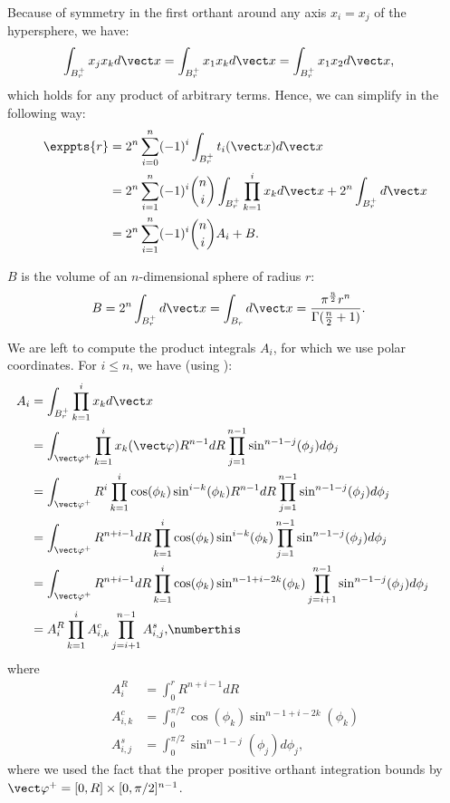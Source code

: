 Because of symmetry in the first orthant around any axis $x_i = x_j$ of the hypersphere, we have:
\begin{align*}
\int_{B^{+}_r}  x_j x_k d\vx &= \int_{B^{+}_r}  x_1 x_k d\vx = \int_{B^{+}_r}  x_1 x_2 d\vx \text{,}
\end{align*}
which holds for any product of arbitrary terms. Hence, we can simplify  in the following way:
\begin{align*}
\exppts{r} &= 2^n \sum_{i=0}^{n} (-1)^{i} \int_{B^{+}_r}  t_i(\vx) d\vx \\
  &= 2^n \sum_{i=1}^{n} (-1)^{i} {n \choose i} \int_{B^{+}_r} \prod_{k=1}^i x_k  d\vx + 2^n  \int_{B^{+}_r}  d\vx \\
  &= 2^n \sum_{i=1}^{n} (-1)^{i} {n \choose i} A_i + B \text{.}
\end{align*}

$B$ is the volume of an $n$-dimensional sphere of radius $r$:
\begin{align*}
B &= 2^n  \int_{B^{+}_r}  d\vx =  \int_{B_r}  d\vx = \frac{\pi^\frac{n}{2} r^n}{\Gamma(\frac{n}{2}+1)} \text{.}
\end{align*}

We are left to compute the product integrals $A_i$, for which we use polar coordinates. For $i \le n$, we have (using ):
\begin{align*}
A_i &= \int_{B^{+}_r} \prod_{k=1}^i x_k  d\vx \\
  &= \int_{\vvarphi^{+}} \prod_{k=1}^i x_k(\vvarphi)  R^{n-1} dR \prod_{j=1}^{n-1}\sin^{n-1-j}(\phi_j) d\phi_j \\ 
  &= \int_{\vvarphi^{+}}  R^i \prod_{k=1}^i \cos(\phi_k)\sin^{i-k}(\phi_k)  R^{n-1} dR \prod_{j=1}^{n-1}\sin^{n-1-j}(\phi_j) d\phi_j \\ 
  &=  \int_{\vvarphi^{+}} R^{n+i-1} dR \prod_{k=1}^i \cos(\phi_k)\sin^{i-k}(\phi_k) \prod_{j=1}^{n-1}\sin^{n-1-j}(\phi_j) d\phi_j \\
  &=  \int_{\vvarphi^{+}} R^{n+i-1} dR \prod_{k=1}^i \cos(\phi_k)\sin^{n-1+i-2k}(\phi_k) \prod_{j=i+1}^{n-1}\sin^{n-1-j}(\phi_j) d\phi_j \quad\quad \\
  &=  A^R_i \prod_{k=1}^i A^c_{i,k}  \prod_{j=i+1}^{n-1} A^s_{i,j}
      \text{,}
  \numberthis \label{eq:threeAs}
\end{align*}
where
\begin{align*}
  A^R_i &=  \int_0^r R^{n+i-1} dR \\
  A^c_{i,k} &= \int_0^{\pi/2} \cos(\phi_k)\sin^{n-1+i-2k}(\phi_k)  \\
  A^s_{i,j} &= \int_0^{\pi/2} \sin^{n-1-j}(\phi_j) d\phi_j
      \text{,}
\end{align*}
where we used the fact that the proper positive orthant integration bounds by $\vvarphi^{+} = [0,R]\times[0,\pi/2]^{n-1}$.

